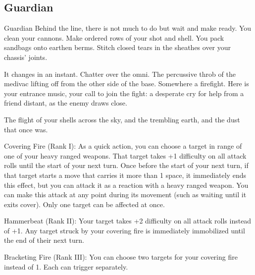 \subsection{Guardian}


                                                    Guardian
Behind the line, there is not much to do but wait and make ready. You clean your cannons. Make
ordered rows of your shot and shell. You pack sandbags onto earthen berms. Stitch closed tears
in the sheathes over your chassis’ joints.

It changes in an instant. Chatter over the omni. The percussive throb of the medivac lifting off
from the other side of the base. Somewhere a firefight. Here is your entrance music, your call to
join the fight: a desperate cry for help from a friend distant, as the enemy draws close.

 The flight of your shells across the sky, and the trembling earth, and the dust that once was.

Covering Fire (Rank I): As a quick action, you can choose a target in range of one of your heavy
ranged weapons. That target takes +1 difficulty on all attack rolls until the start of your next turn.
Once before the start of your next turn, if that target starts a move that carries it more than 1
space, it immediately ends this effect, but you can attack it as a reaction with a heavy ranged
weapon. You can make this attack at any point during its movement (such as waiting until it exits
cover). Only one target can be affected at once.

 Hammerbeat (Rank II): Your target takes +2 difficulty on all attack rolls instead of +1. Any target
struck by your covering fire is immediately immobilized until the end of their next turn.

 Bracketing Fire (Rank III): You can choose two targets for your covering fire instead of 1. Each
can trigger separately.